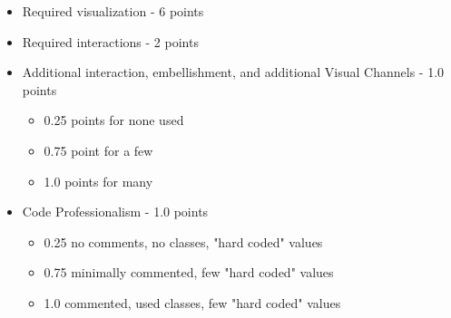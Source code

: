 \documentclass[a4paper,12pt]{article}
\begin{document}
\begin{itemize}
	\item Required visualization - 6 points
	\item Required interactions - 2 points
	\item Additional interaction, embellishment, and additional Visual Channels - 1.0 points 
		\begin{itemize}
    		\item 0.25 points for none used
    		\item 0.75 point for a few
            \item 1.0 points for many
		\end{itemize}
	\item Code Professionalism - 1.0 points
		\begin{itemize}
            \item 0.25 no comments, no classes, "hard coded" values
            \item 0.75 minimally commented, few "hard coded" values
            \item 1.0 commented, used classes, few "hard coded" values
		\end{itemize}
\end{itemize}
\end{document}

